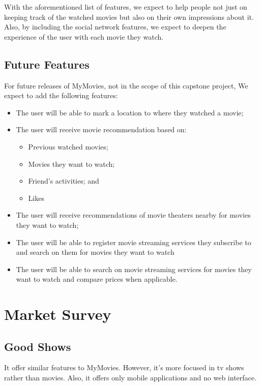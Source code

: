 With the aforementioned list of features, we expect to help people not just on
keeping track of the watched movies but also on their own impressions about it.
Also, by including the social network features, we expect to deepen the
experience of the user with each movie they watch.

\subsection{Future Features}

For future releases of MyMovies, not in the scope of this capstone project, We
expect to add the following features:

\begin{itemize}
  \item The user will be able to mark a location to where they watched a movie;
  \item The user will receive movie recommendation based on:
    \begin{itemize}
      \item Previous watched movies;
      \item Movies they want to watch;
      \item Friend's activities; and
      \item Likes
    \end{itemize}
  \item The user will receive recommendations of movie theaters nearby for
    movies they want to watch;
  \item The user will be able to register movie streaming services they
    subscribe to and search on them for movies they want to watch
  \item The user will be able to search on movie streaming services for movies
    they want to watch and compare prices when applicable.
\end{itemize}

\section{Market Survey}

\subsection{Good Shows\cite{goodshows}}

It offer similar features to MyMovies. However, it's more focused in tv shows
rather than movies. Also, it offers only mobile applications and no web
interface.

